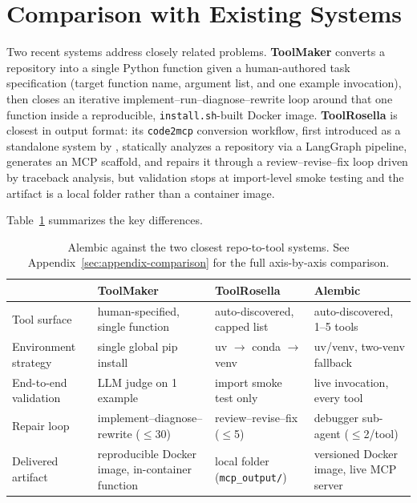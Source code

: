 \section{Comparison with Existing Systems}
\label{sec:related}

Two recent systems address closely related problems. \textbf{ToolMaker} \citep{toolmaker2025} converts a repository into a single Python function given a human-authored task specification (target function name, argument list, and one example invocation), then closes an iterative implement–run–diagnose–rewrite loop around that one function inside a reproducible, \texttt{install.sh}-built Docker image. \textbf{ToolRosella} \citep{toolrosella2026} is closest in output format: its \texttt{code2mcp} conversion workflow, first introduced as a standalone system by \citet{code2mcp2025}, statically analyzes a repository via a LangGraph pipeline, generates an MCP scaffold, and repairs it through a review–revise–fix loop driven by traceback analysis, but validation stops at import-level smoke testing and the artifact is a local folder rather than a container image.

Table~\ref{tab:comparison} summarizes the key differences.

\begin{table}[t]
  \centering
  \small
  \begin{tabular}{@{}p{2.3cm}p{4cm}p{4cm}p{4cm}@{}}
    \toprule
    & \textbf{ToolMaker} & \textbf{ToolRosella} & \textbf{Alembic} \\
    \midrule
    Tool surface & human-specified, single function & auto-discovered, capped list & auto-discovered, 1--5 tools \\
    Environment strategy & single global pip install & uv $\to$ conda $\to$ venv & uv/venv, two-venv fallback \\
    End-to-end validation & LLM judge on 1 example & import smoke test only & live invocation, every tool \\
    Repair loop & implement--diagnose--rewrite ($\le$30) & review--revise--fix ($\le$5) & debugger sub-agent ($\le$2/tool) \\
    Delivered artifact & reproducible Docker image, in-container function & local folder (\texttt{mcp\_output/}) & versioned Docker image, live MCP server \\
    \bottomrule
  \end{tabular}
  \caption{Alembic against the two closest repo-to-tool systems. See Appendix~\ref{sec:appendix-comparison} for the full axis-by-axis comparison.}
  \label{tab:comparison}
\end{table}

